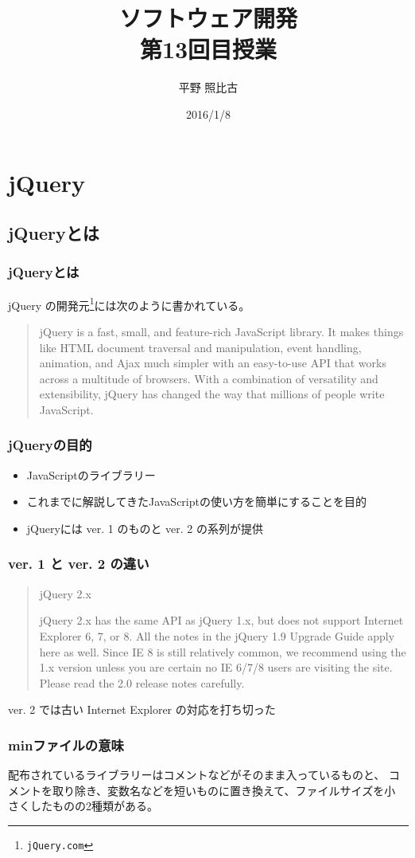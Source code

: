 \documentclass[dvipsk]{beamer}
\title{ソフトウェア開発\\第13回目授業}
\author{平野 照比古}
\institute{}
\date{2016/1/8}
\begin{document}
\frame{\maketitle}
\section{jQuery}
\subsection{jQueryとは}
\begin{frame}[containsverbatim]
\frametitle{jQueryとは}
jQuery の開発元\footnote{\texttt{jQuery.com}}には次のように書かれている。
\begin{quotation}
jQuery is a fast, small, and feature-rich JavaScript library. It makes
 things like HTML document traversal and manipulation, event handling,
 animation, and Ajax much simpler with an easy-to-use API that works
 across a multitude of browsers. With a combination of versatility and
 extensibility, jQuery has changed the way that millions of people write
 JavaScript.
\end{quotation}
\end{frame}
\begin{frame}[containsverbatim]
\frametitle{jQueryの目的}
\begin{itemize}
 \item JavaScriptのライブラリー
 \item これまでに解説してきたJavaScriptの使い方を簡単にすることを目的
 \item jQueryには ver. 1 のものと ver. 2 の系列が提供
\end{itemize}
\end{frame}
\begin{frame}[containsverbatim]
\frametitle{ver. 1 と ver. 2 の違い}
\begin{quotation}
jQuery 2.x

jQuery 2.x has the same API as jQuery 1.x, but does not support Internet
Explorer 6, 7, or 8. All the notes in the jQuery 1.9 Upgrade Guide apply
here as well. Since IE 8 is still relatively common, we recommend using
the 1.x version unless you are certain no IE 6/7/8 users are visiting
the site. Please read the 2.0 release notes carefully. 
\end{quotation}
 ver. 2 では古い Internet Explorer の対応を打ち切った
\end{frame}
\begin{frame}[containsverbatim]
\frametitle{minファイルの意味}
配布されているライブラリーはコメントなどがそのまま入っているものと、
コメントを取り除き、変数名などを短いものに置き換えて、ファイルサイズを小
さくしたものの2種類がある。
\end{frame}
\newcommand{\FuncRef}[1]{%
\refstepcounter{Func}\label{#1}({\bfseries 機能\arabic{Func}})}
\end{document}
